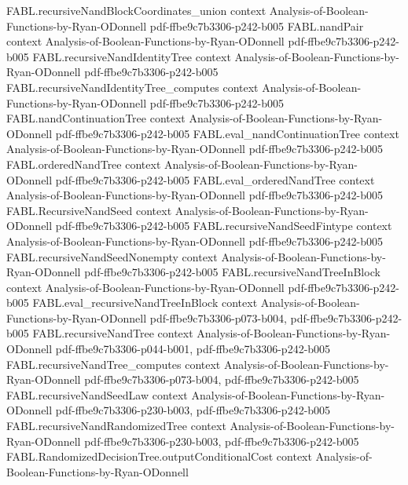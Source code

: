 \begin{theorem}
\proofstep
  {FABL.recursiveNandBlockCoordinates_union}
  {context}
  {Analysis-of-Boolean-Functions-by-Ryan-ODonnell}
  {pdf-ffbe9c7b3306-p242-b005}
\proofstep
  {FABL.nandPair}
  {context}
  {Analysis-of-Boolean-Functions-by-Ryan-ODonnell}
  {pdf-ffbe9c7b3306-p242-b005}
\proofstep
  {FABL.recursiveNandIdentityTree}
  {context}
  {Analysis-of-Boolean-Functions-by-Ryan-ODonnell}
  {pdf-ffbe9c7b3306-p242-b005}
\proofstep
  {FABL.recursiveNandIdentityTree_computes}
  {context}
  {Analysis-of-Boolean-Functions-by-Ryan-ODonnell}
  {pdf-ffbe9c7b3306-p242-b005}
\proofstep
  {FABL.nandContinuationTree}
  {context}
  {Analysis-of-Boolean-Functions-by-Ryan-ODonnell}
  {pdf-ffbe9c7b3306-p242-b005}
\proofstep
  {FABL.eval_nandContinuationTree}
  {context}
  {Analysis-of-Boolean-Functions-by-Ryan-ODonnell}
  {pdf-ffbe9c7b3306-p242-b005}
\proofstep
  {FABL.orderedNandTree}
  {context}
  {Analysis-of-Boolean-Functions-by-Ryan-ODonnell}
  {pdf-ffbe9c7b3306-p242-b005}
\proofstep
  {FABL.eval_orderedNandTree}
  {context}
  {Analysis-of-Boolean-Functions-by-Ryan-ODonnell}
  {pdf-ffbe9c7b3306-p242-b005}
\proofstep
  {FABL.RecursiveNandSeed}
  {context}
  {Analysis-of-Boolean-Functions-by-Ryan-ODonnell}
  {pdf-ffbe9c7b3306-p242-b005}
\proofstep
  {FABL.recursiveNandSeedFintype}
  {context}
  {Analysis-of-Boolean-Functions-by-Ryan-ODonnell}
  {pdf-ffbe9c7b3306-p242-b005}
\proofstep
  {FABL.recursiveNandSeedNonempty}
  {context}
  {Analysis-of-Boolean-Functions-by-Ryan-ODonnell}
  {pdf-ffbe9c7b3306-p242-b005}
\proofstep
  {FABL.recursiveNandTreeInBlock}
  {context}
  {Analysis-of-Boolean-Functions-by-Ryan-ODonnell}
  {pdf-ffbe9c7b3306-p242-b005}
\proofstep
  {FABL.eval_recursiveNandTreeInBlock}
  {context}
  {Analysis-of-Boolean-Functions-by-Ryan-ODonnell}
  {pdf-ffbe9c7b3306-p073-b004,
    pdf-ffbe9c7b3306-p242-b005}
\proofstep
  {FABL.recursiveNandTree}
  {context}
  {Analysis-of-Boolean-Functions-by-Ryan-ODonnell}
  {pdf-ffbe9c7b3306-p044-b001,
    pdf-ffbe9c7b3306-p242-b005}
\proofstep
  {FABL.recursiveNandTree_computes}
  {context}
  {Analysis-of-Boolean-Functions-by-Ryan-ODonnell}
  {pdf-ffbe9c7b3306-p073-b004,
    pdf-ffbe9c7b3306-p242-b005}
\proofstep
  {FABL.recursiveNandSeedLaw}
  {context}
  {Analysis-of-Boolean-Functions-by-Ryan-ODonnell}
  {pdf-ffbe9c7b3306-p230-b003,
    pdf-ffbe9c7b3306-p242-b005}
\proofstep
  {FABL.recursiveNandRandomizedTree}
  {context}
  {Analysis-of-Boolean-Functions-by-Ryan-ODonnell}
  {pdf-ffbe9c7b3306-p230-b003,
    pdf-ffbe9c7b3306-p242-b005}
\proofstep
  {FABL.RandomizedDecisionTree.outputConditionalCost}
  {context}
  {Analysis-of-Boolean-Functions-by-Ryan-ODonnell}

\end{theorem}
